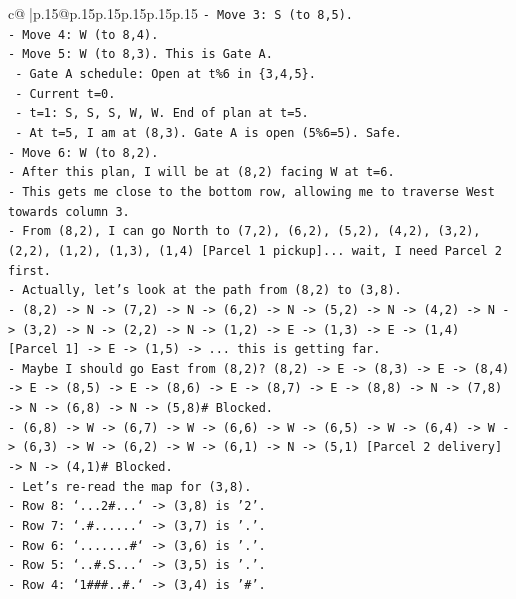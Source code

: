 \documentclass{article}
\begin{document}
{\begin{supertabular}{c@{$\;$}|p{.15\linewidth}@{}p{.15\linewidth}p{.15\linewidth}p{.15\linewidth}p{.15\linewidth}p{.15\linewidth}}
{{{\texttt{{-} Move 3: S (to 8,5).} \\
\texttt{{-} Move 4: W (to 8,4).} \\
\texttt{{-} Move 5: W (to 8,3). This is Gate A.} \\
\texttt{  {-} Gate A schedule: Open at t\%6 in \{3,4,5\}.} \\
\texttt{  {-} Current t=0.} \\
\texttt{  {-} t=1: S, S, S, W, W. End of plan at t=5.} \\
\texttt{  {-} At t=5, I am at (8,3). Gate A is open (5\%6=5). Safe.} \\
\texttt{{-} Move 6: W (to 8,2).} \\
\texttt{{-} After this plan, I will be at (8,2) facing W at t=6.} \\
\texttt{{-} This gets me close to the bottom row, allowing me to traverse West towards column 3.} \\
\texttt{{-} From (8,2), I can go North to (7,2), (6,2), (5,2), (4,2), (3,2), (2,2), (1,2), (1,3), (1,4) {[}Parcel 1 pickup{]}... wait, I need Parcel 2 first.} \\
\texttt{{-} Actually, let's look at the path from (8,2) to (3,8).} \\
\texttt{{-} (8,2) {-}> N {-}> (7,2) {-}> N {-}> (6,2) {-}> N {-}> (5,2) {-}> N {-}> (4,2) {-}> N {-}> (3,2) {-}> N {-}> (2,2) {-}> N {-}> (1,2) {-}> E {-}> (1,3) {-}> E {-}> (1,4) {[}Parcel 1{]} {-}> E {-}> (1,5) {-}> ... this is getting far.} \\
\texttt{{-} Maybe I should go East from (8,2)? (8,2) {-}> E {-}> (8,3) {-}> E {-}> (8,4) {-}> E {-}> (8,5) {-}> E {-}> (8,6) {-}> E {-}> (8,7) {-}> E {-}> (8,8) {-}> N {-}> (7,8) {-}> N {-}> (6,8) {-}> N {-}> (5,8)\# Blocked.} \\
\texttt{{-} (6,8) {-}> W {-}> (6,7) {-}> W {-}> (6,6) {-}> W {-}> (6,5) {-}> W {-}> (6,4) {-}> W {-}> (6,3) {-}> W {-}> (6,2) {-}> W {-}> (6,1) {-}> N {-}> (5,1) {[}Parcel 2 delivery{]} {-}> N {-}> (4,1)\# Blocked.} \\
\texttt{{-} Let's re{-}read the map for (3,8).} \\
\texttt{{-} Row 8: `...2\#...` {-}> (3,8) is '2'.} \\
\texttt{{-} Row 7: `.\#......` {-}> (3,7) is '.'.} \\
\texttt{{-} Row 6: `.......\#` {-}> (3,6) is '.'.} \\
\texttt{{-} Row 5: `..\#.S...` {-}> (3,5) is '.'.} \\
\texttt{{-} Row 4: `1\#\#\#..\#.` {-}> (3,4) is '\#'.} \\
}}}
\end{supertabular}}
\end{document}

